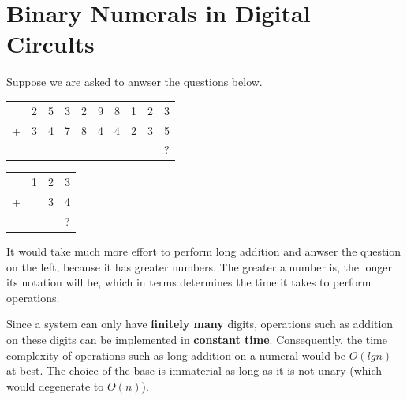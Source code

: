 \documentclass[\main/thesis.tex]{subfiles}
\begin{document}
\section{Binary Numerals in Digital Circults}

Suppose we are asked to anwser the questions below.

\vspace{15pt}
\noindent\begin{minipage}{.45\textwidth}
    \begin{center}
        \begin{tabular}{c@{\,}c@{\,}c@{\,}c@{\,}c@{\,}c@{\,}c@{\,}c@{\,}c@{\,}c}
          & 2 & 5 & 3 & 2 & 9 & 8 & 1 & 2 & 3 \\
        + & 3 & 4 & 7 & 8 & 4 & 4 & 2 & 3 & 5 \\
        \hline
          &   &   &   &   &   &   &   &   & ? \\
        \end{tabular}
    \end{center}
\end{minipage}\hfill
\begin{minipage}{.48\textwidth}
    \begin{center}
        \begin{tabular}{c@{\,}c@{\,}c@{\,}c}
              & 1 & 2 & 3 \\
            + &   & 3 & 4 \\
            \hline
              &   &   & ? \\
        \end{tabular}
    \end{center}
\end{minipage}
\vspace{15pt}

It would take much more effort to perform long addition and anwser the question
on the left, because it has greater numbers. The greater a number is,
the longer its notation will be, which in terms determines the time it takes to
perform operations.

Since a system can only have \textbf{finitely many} digits, operations such as
addition on these digits can be implemented in \textbf{constant time}.
Consequently, the time complexity of operations such as long addition on a
numeral would be $ O(lg n) $ at best.
The choice of the base is immaterial as long as it is not unary
(which would degenerate to $ O(n) $).
\end{document}
